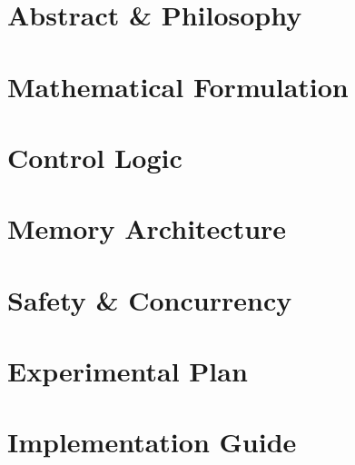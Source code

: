 \documentclass[a4paper,12pt]{article}
\begin{document}
\section{Abstract \& Philosophy}\label{sec:abstract}


\newpage

\section{Mathematical Formulation}\label{sec:mathematical}


\newpage

\section{Control Logic}\label{sec:control}


\newpage

\section{Memory Architecture}\label{sec:memory}


\newpage

\section{Safety \& Concurrency}\label{sec:safety}


\newpage

\section{Experimental Plan}\label{sec:experimental}


\newpage

\section{Implementation Guide}\label{sec:implementation}


\end{document}
